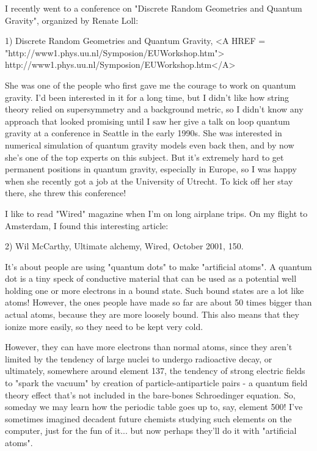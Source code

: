 


I recently went to a conference on "Discrete Random Geometries and
Quantum Gravity", organized by Renate Loll:

1) Discrete Random Geometries and Quantum Gravity,
<A HREF = "http://www1.phys.uu.nl/Symposion/EUWorkshop.htm">
http://www1.phys.uu.nl/Symposion/EUWorkshop.htm</A>

She was one of the people who first gave me the courage to work on
quantum gravity.  I'd been interested in it for a long time, but I
didn't like how string theory relied on supersymmetry and a background
metric, so I didn't know any approach that looked promising until I saw
her give a talk on loop quantum gravity at a conference in Seattle in
the early 1990s.  She was interested in numerical simulation of quantum
gravity models even back then, and by now she's one of the top experts
on this subject.  But it's extremely hard to get permanent positions in
quantum gravity, especially in Europe, so I was happy when she recently
got a job at the University of Utrecht.  To kick off her stay there, she
threw this conference!

I like to read "Wired" magazine when I'm on long airplane
trips.  On my flight to Amsterdam, I found this interesting article:

2) Wil McCarthy, Ultimate alchemy, Wired, October 2001, 150.

It's about people are using "quantum dots" to make
"artificial atoms".  A quantum dot is a tiny speck of
conductive material that can be used as a potential well holding one or
more electrons in a bound state.  Such bound states are a lot like
atoms!  However, the ones people have made so far are about 50 times
bigger than actual atoms, because they are more loosely bound.  This
also means that they ionize more easily, so they need to be kept very
cold.

However, they can have more electrons than normal atoms, since they
aren't limited by the tendency of large nuclei to undergo radioactive
decay, or ultimately, somewhere around element 137, the tendency of
strong electric fields to "spark the vacuum" by creation of
particle-antiparticle pairs - a quantum field theory effect that's not
included in the bare-bones Schroedinger equation.   So, someday we may
learn how the periodic table goes up to, say, element 500!  I've
sometimes imagined decadent future chemists studying such elements on
the computer, just for the fun of it... but now perhaps they'll do it
with "artificial atoms".

